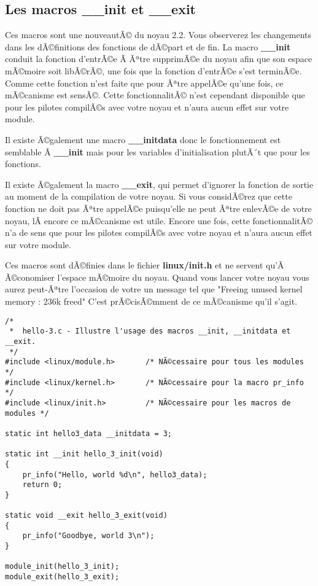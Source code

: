 \documentclass[11pt]{article}
\begin{document}
\subsection*{Les macros \_\_init et \_\_exit}
\label{sec-4-3}

Ces macros sont une nouveautÃ© du noyau 2.2. Vous observerez les changements dans les dÃ©finitions des fonctions de dÃ©part et de fin. La macro \textbf{\_\_init} conduit la fonction d'entrÃ©e Ã  Ãªtre supprimÃ©e du noyau afin que son espace mÃ©moire soit libÃ©rÃ©, une fois que la fonction d'entrÃ©e s'est terminÃ©e. Comme cette fonction n'est faite que pour Ãªtre appelÃ©e qu'une fois, ce mÃ©canisme est sensÃ©. Cette fonctionnalitÃ© n'est cependant disponible que pour les pilotes compilÃ©s avec votre noyau et n'aura aucun effet sur votre module.

Il existe Ã©galement une macro \textbf{\_\_initdata} donc le fonctionnement est semblable Ã  \textbf{\_\_init} mais pour les variables d'initialisation plutÃ´t que pour les fonctions.

Il existe Ã©galement la macro \textbf{\_\_exit}, qui permet d'ignorer la fonction de sortie au moment de la compilation de votre noyau. Si vous considÃ©rez que cette fonction ne doit pas Ãªtre appelÃ©e puisqu'elle ne peut Ãªtre enlevÃ©e de votre noyau, lÃ  encore ce mÃ©canisme est utile. Encore une fois, cette fonctionnalitÃ© n'a de sens que pour les pilotes compilÃ©s avec votre noyau et n'aura aucun effet sur votre module.

Ces macros sont dÃ©finies dans le fichier \textbf{linux/init.h} et ne servent qu'Ã  Ã©conomiser l'espace mÃ©moire du noyau. Quand vous lancer votre noyau vous aurez peut-Ãªtre l'occasion de votre un message tel que "Freeing unused kernel memory : 236k freed" C'est prÃ©cisÃ©mment de ce mÃ©canisme qu'il s'agit.


\begin{verbatim}
/*
 *  hello-3.c - Illustre l'usage des macros __init, __initdata et __exit.
 */
#include <linux/module.h>       /* NÃ©cessaire pour tous les modules */
#include <linux/kernel.h>       /* NÃ©cessaire pour la macro pr_info */
#include <linux/init.h>         /* NÃ©cessaire pour les macros de modules */

static int hello3_data __initdata = 3;

static int __init hello_3_init(void)
{
    pr_info("Hello, world %d\n", hello3_data);
    return 0;
}

static void __exit hello_3_exit(void)
{
    pr_info("Goodbye, world 3\n");
}

module_init(hello_3_init);
module_exit(hello_3_exit);
\end{verbatim}
\end{document}
